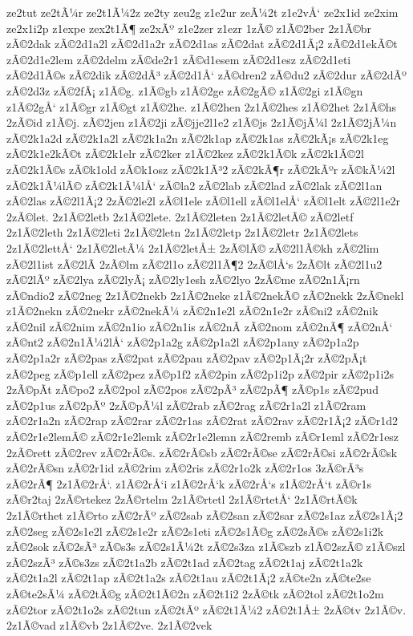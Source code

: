 {ze2tut
ze2tÃ¼r
ze2t1Ã¼2z
ze2ty
zeu2g
z1e2ur
zeÃ¼2t
z1e2vÅ‘
ze2x1id
ze2xim
ze2x1i2p
z1expe
zex2t1Ã¶
ze2xÃº
z1e2zer
z1ezr
1zÃ©
z1Ã©2ber
2z1Ã©br
zÃ©2dak
zÃ©2d1a2l
zÃ©2d1a2r
zÃ©2d1as
zÃ©2dat
zÃ©2d1Ã¡2
zÃ©2d1ekÃ©t
zÃ©2d1e2lem
zÃ©2delm
zÃ©de2r1
zÃ©d1esem
zÃ©2d1esz
zÃ©2d1eti
zÃ©2d1Ã©s
zÃ©2dik
zÃ©2dÃ³
zÃ©2d1Å‘
zÃ©dren2
zÃ©du2
zÃ©2dur
zÃ©2dÃº
zÃ©2d3z
zÃ©2fÃ¡
z1Ã©g.
z1Ã©gb
z1Ã©2ge
zÃ©2gÃ©
z1Ã©2gi
z1Ã©gn
z1Ã©2gÅ‘
z1Ã©gr
z1Ã©gt
z1Ã©2he.
z1Ã©2hen
2z1Ã©2hes
z1Ã©2het
2z1Ã©hs
2zÃ©id
z1Ã©j.
zÃ©2jen
z1Ã©2ji
zÃ©jje2l1e2
z1Ã©js
2z1Ã©jÃ¼l
2z1Ã©2jÃ¼n
zÃ©2k1a2d
zÃ©2k1a2l
zÃ©2k1a2n
zÃ©2k1ap
zÃ©2k1as
zÃ©2kÃ¡s
zÃ©2k1eg
zÃ©2k1e2kÃ©t
zÃ©2k1elr
zÃ©2ker
z1Ã©2kez
zÃ©2k1Ã©k
zÃ©2k1Ã©2l
zÃ©2k1Ã©s
zÃ©k1old
zÃ©k1osz
zÃ©2k1Ã³2
zÃ©2kÃ¶r
zÃ©2kÃºr
zÃ©kÃ¼2l
zÃ©2k1Ã¼lÃ©
zÃ©2k1Ã¼lÅ‘
zÃ©la2
zÃ©2lab
zÃ©2lad
zÃ©2lak
zÃ©2l1an
zÃ©2las
zÃ©2l1Ã¡2
2zÃ©2le2l
zÃ©l1ele
zÃ©l1ell
zÃ©l1elÅ‘
zÃ©l1elt
zÃ©2l1e2r
2zÃ©let.
2z1Ã©2letb
2z1Ã©2lete.
2z1Ã©2leten
2z1Ã©2letÃ©
zÃ©2letf
2z1Ã©2leth
2z1Ã©2leti
2z1Ã©2letn
2z1Ã©2letp
2z1Ã©2letr
2z1Ã©2lets
2z1Ã©2lettÅ‘
2z1Ã©2letÃ¼
2z1Ã©2letÅ±
2zÃ©lÃ©
zÃ©2l1Ã©kh
zÃ©2lim
zÃ©2l1ist
zÃ©2lÃ­
2zÃ©lm
zÃ©2l1o
zÃ©2l1Ã¶2
2zÃ©lÅ‘s
2zÃ©lt
zÃ©2l1u2
zÃ©2lÃº
zÃ©2lya
zÃ©2lyÃ¡
zÃ©2ly1esh
zÃ©2lyo
2zÃ©me
zÃ©2n1Ã¡rn
zÃ©ndio2
zÃ©2neg
2z1Ã©2nekb
2z1Ã©2neke
z1Ã©2nekÃ©
zÃ©2nekk
2zÃ©nekl
z1Ã©2nekn
zÃ©2nekr
zÃ©2nekÃ¼
zÃ©2n1e2l
zÃ©2n1e2r
zÃ©ni2
zÃ©2nik
zÃ©2nil
zÃ©2nim
zÃ©2n1io
zÃ©2n1is
zÃ©2nÃ­
zÃ©2nom
zÃ©2nÃ¶
zÃ©2nÅ‘
zÃ©nt2
zÃ©2n1Ã¼2lÅ‘
zÃ©2p1a2g
zÃ©2p1a2l
zÃ©2p1any
zÃ©2p1a2p
zÃ©2p1a2r
zÃ©2pas
zÃ©2pat
zÃ©2pau
zÃ©2pav
zÃ©2p1Ã¡2r
zÃ©2pÃ¡t
zÃ©2peg
zÃ©p1ell
zÃ©2pez
zÃ©p1f2
zÃ©2pin
zÃ©2p1i2p
zÃ©2pir
zÃ©2p1i2s
2zÃ©pÃ­t
zÃ©po2
zÃ©2pol
zÃ©2pos
zÃ©2pÃ³
zÃ©2pÃ¶
zÃ©p1s
zÃ©2pud
zÃ©2p1us
zÃ©2pÃº
2zÃ©pÃ¼l
zÃ©2rab
zÃ©2rag
zÃ©2r1a2l
z1Ã©2ram
zÃ©2r1a2n
zÃ©2rap
zÃ©2rar
zÃ©2r1as
zÃ©2rat
zÃ©2rav
zÃ©2r1Ã¡2
zÃ©r1d2
zÃ©2r1e2lemÃ©
zÃ©2r1e2lemk
zÃ©2r1e2lemn
zÃ©2remb
zÃ©r1eml
zÃ©2r1esz
2zÃ©rett
zÃ©2rev
zÃ©2rÃ©s.
zÃ©2rÃ©sb
zÃ©2rÃ©se
zÃ©2rÃ©si
zÃ©2rÃ©sk
zÃ©2rÃ©sn
zÃ©2r1id
zÃ©2rim
zÃ©2ris
zÃ©2r1o2k
zÃ©2r1os
3zÃ©rÃ³s
zÃ©2rÃ¶
2z1Ã©2rÅ‘.
z1Ã©2rÅ‘i
z1Ã©2rÅ‘k
zÃ©2rÅ‘s
z1Ã©2rÅ‘t
zÃ©r1s
zÃ©r2taj
2zÃ©rtekez
2zÃ©rtelm
2z1Ã©rtetl
2z1Ã©rtetÅ‘
2z1Ã©rtÃ©k
2z1Ã©rthet
z1Ã©rto
zÃ©2rÃº
zÃ©2sab
zÃ©2san
zÃ©2sar
zÃ©2s1az
zÃ©2s1Ã¡2
zÃ©2seg
zÃ©2s1e2l
zÃ©2s1e2r
zÃ©2s1eti
zÃ©2s1Ã©g
zÃ©2sÃ©s
zÃ©2s1i2k
zÃ©2sok
zÃ©2sÃ³
zÃ©s3s
zÃ©2s1Ã¼2t
zÃ©2s3za
z1Ã©szb
z1Ã©2szÃ©
z1Ã©szl
zÃ©2szÃ³
zÃ©s3zs
zÃ©2t1a2b
zÃ©2t1ad
zÃ©2tag
zÃ©2t1aj
zÃ©2t1a2k
zÃ©2t1a2l
zÃ©2t1ap
zÃ©2t1a2s
zÃ©2t1au
zÃ©2t1Ã¡2
zÃ©te2n
zÃ©te2se
zÃ©te2sÃ¼
zÃ©2tÃ©g
zÃ©2t1Ã©2n
zÃ©2t1i2
2zÃ©tk
zÃ©2tol
zÃ©2t1o2m
zÃ©2tor
zÃ©2t1o2s
zÃ©2tun
zÃ©2tÃº
zÃ©2t1Ã¼2
zÃ©2t1Å±
2zÃ©tv
2z1Ã©v.
2z1Ã©vad
z1Ã©vb
2z1Ã©2ve.
2z1Ã©2vek
}
